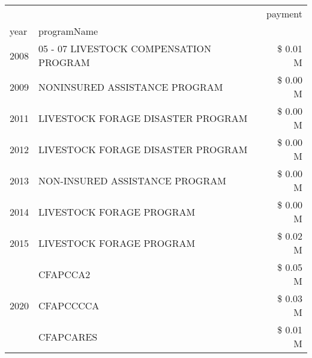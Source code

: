 \begin{tabular}{llr}
\toprule
 &  & payment \\
year & programName &  \\
\midrule
2008 & 05 - 07 LIVESTOCK COMPENSATION PROGRAM & \$ 0.01 M \\
\cline{1-3}
2009 & NONINSURED ASSISTANCE PROGRAM & \$ 0.00 M \\
\cline{1-3}
2011 & LIVESTOCK FORAGE DISASTER PROGRAM & \$ 0.00 M \\
\cline{1-3}
2012 & LIVESTOCK FORAGE DISASTER PROGRAM & \$ 0.00 M \\
\cline{1-3}
2013 & NON-INSURED ASSISTANCE PROGRAM & \$ 0.00 M \\
\cline{1-3}
2014 & LIVESTOCK FORAGE PROGRAM & \$ 0.00 M \\
\cline{1-3}
2015 & LIVESTOCK FORAGE PROGRAM & \$ 0.02 M \\
\cline{1-3}
\multirow[t]{3}{*}{2020} & CFAPCCA2 & \$ 0.05 M \\
 & CFAPCCCCA & \$ 0.03 M \\
 & CFAPCARES & \$ 0.01 M \\
\cline{1-3}
\bottomrule
\end{tabular}
